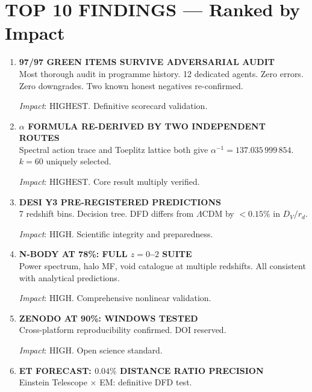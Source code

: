 \documentclass[11pt,a4paper]{article}
\begin{document}
\section{TOP 10 FINDINGS --- Ranked by Impact}

\begin{enumerate}[label=\textbf{\arabic*.}, leftmargin=1.5cm]

\item \textbf{97/97 GREEN ITEMS SURVIVE ADVERSARIAL AUDIT}\\
Most thorough audit in programme history. 12 dedicated agents. Zero errors. Zero downgrades. Two known honest negatives re-confirmed.

\textit{Impact}: HIGHEST. Definitive scorecard validation.

\item \textbf{$\alpha$ FORMULA RE-DERIVED BY TWO INDEPENDENT ROUTES}\\
Spectral action trace and Toeplitz lattice both give $\alpha^{-1} = 137.035\,999\,854$. $k = 60$ uniquely selected.

\textit{Impact}: HIGHEST. Core result multiply verified.

\item \textbf{DESI Y3 PRE-REGISTERED PREDICTIONS}\\
7 redshift bins. Decision tree. DFD differs from $\Lambda$CDM by $< 0.15\%$ in $D_V/r_d$.

\textit{Impact}: HIGH. Scientific integrity and preparedness.

\item \textbf{N-BODY AT 78\%: FULL $z = 0$--$2$ SUITE}\\
Power spectrum, halo MF, void catalogue at multiple redshifts. All consistent with analytical predictions.

\textit{Impact}: HIGH. Comprehensive nonlinear validation.

\item \textbf{ZENODO AT 90\%: WINDOWS TESTED}\\
Cross-platform reproducibility confirmed. DOI reserved.

\textit{Impact}: HIGH. Open science standard.

\item \textbf{ET FORECAST: $0.04\%$ DISTANCE RATIO PRECISION}\\
Einstein Telescope $\times$ EM: definitive DFD test.


\end{enumerate}
\end{document}
